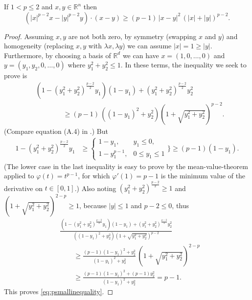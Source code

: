 \documentclass[final,leqno,onefignum,onetabnum]{siamltex1213bueler}
\newcommand\RR{\mathbb{R}}
\begin{document}
\begin{lemma}  \label{lem:psmallinequality}  If $1<p\le 2$ and $x,y\in\RR^n$ then
\begin{equation}
\left(|x|^{p-2} x - |y|^{p-2} y\right)\cdot(x-y) \ge (p-1)\, |x-y|^2 \, \left(|x|+|y|\right)^{p-2}. \label{eq:psmallinequality}
\end{equation}
\end{lemma}

\begin{proof}  Assuming $x,y$ are not both zero, by symmetry (swapping $x$ and $y$) and homogeneity (replacing $x,y$ with $\lambda x,\lambda y$) we can assume $|x| = 1 \ge |y|$.  Furthermore, by choosing a basis of $\RR^d$ we can have $x=(1,0,\dots,0)$ and $y=(y_1,y_2,0,\dots,0)$ where $y_1^2+y_2^2 \le 1$.  In these terms, the inequality we seek to prove is
\begin{align*}
&\left(1 - (y_1^2+y_2^2)^{\frac{p-2}{2}} y_1\right) (1-y_1) + (y_1^2+y_2^2)^{\frac{p-2}{2}} y_2^2 \\
&\qquad\qquad \ge (p-1)\, \left((1-y_1)^2+y_2^2\right) \left(1 + \sqrt{y_1^2+y_2^2} \right)^{p-2}.
\end{align*}
(Compare equation (A.4) in \cite{Peral1997}.)  But
\begin{align*}
1 - (y_1^2+y_2^2)^{\frac{p-2}{2}} y_1
      &\ge \begin{cases} 1-y_1, & y_1 \le 0, \\
                        1-y_1^{p-1}, & 0 \le y_1 \le 1 \end{cases}\Bigg\}
      \ge (p-1) (1-y_1).
\end{align*}
(The lower case in the last inequality is easy to prove by the mean-value-theorem applied to $\varphi(t)=t^{p-1}$, for which $\varphi'(1)=p-1$ is the minimum value of the derivative on $t\in[0,1]$.)  Also noting $(y_1^2+y_2^2)^{\frac{p-2}{2}} \ge 1$ and $\left(1 + \sqrt{y_1^2+y_2^2} \right)^{2-p} \ge 1$, because $|y|\le 1$ and $p-2\le 0$, thus
\begin{align*}
&\frac{\left(1 - (y_1^2+y_2^2)^{\frac{p-2}{2}} y_1\right) (1-y_1) + (y_1^2+y_2^2)^{\frac{p-2}{2}} y_2^2}
      {\left((1-y_1)^2+y_2^2\right) \left(1 + \sqrt{y_1^2+y_2^2} \right)^{p-2}} \\
&\qquad \ge \frac{(p-1) (1-y_1)^2 + y_2^2}
      {(1-y_1)^2+y_2^2} \,  \left(1 + \sqrt{y_1^2+y_2^2} \right)^{2-p} \\
&\qquad \ge \frac{(p-1) (1-y_1)^2 + (p-1) y_2^2}{(1-y_1)^2+y_2^2} = p-1.
\end{align*}
This proves \eqref{eq:psmallinequality}. \end{proof}
\end{document}
